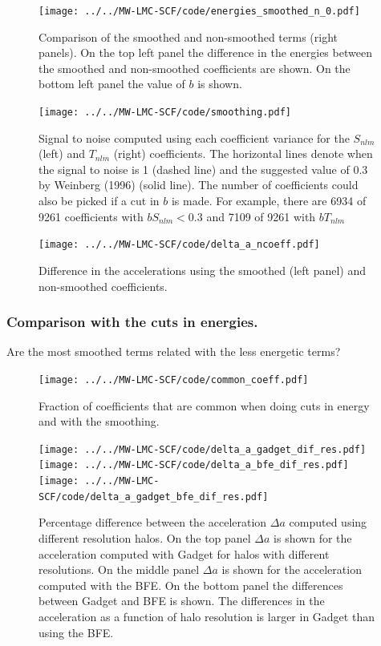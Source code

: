 \documentclass[14pt]{article}
\begin{document}
\begin{figure}[H]
  \centering
  \texttt{[image: ../../MW-LMC-SCF/code/energies\_smoothed\_n\_0.pdf]}
  \caption{Comparison of the smoothed and non-smoothed terms (right panels). On the top left
  panel the difference in the energies between the smoothed and non-smoothed
  coefficients are shown. On the bottom left panel the value of $b$ is shown.}
\end{figure}


\begin{figure}[H]
  \centering
  \texttt{[image: ../../MW-LMC-SCF/code/smoothing.pdf]}
  \caption{Signal to noise computed using each coefficient variance for the
  $S_{nlm}$ (left) and $T_{nlm}$ (right) coefficients. The horizontal lines
  denote when the signal to noise is 1 (dashed line) and the suggested value of
  0.3 by Weinberg (1996) (solid line). The number of coefficients could also be
  picked if a cut in $b$ is made. For example, there are 6934 of 9261 coefficients with
  $bS_{nlm}<0.3$ and 7109 of 9261 with $bT_{nlm}$}
\end{figure}



\begin{figure}[H]
  \centering
  \texttt{[image: ../../MW-LMC-SCF/code/delta\_a\_ncoeff.pdf]}
  \caption{Difference in the accelerations using the smoothed (left panel) and
  non-smoothed coefficients. }
\end{figure}



\subsubsection{Comparison with the cuts in energies.}

Are the most smoothed terms related with the less energetic terms? 


\begin{figure}[H]
  \centering
  \texttt{[image: ../../MW-LMC-SCF/code/common\_coeff.pdf]}
  \caption{Fraction of coefficients that are common when doing cuts in energy
  and with the smoothing.}
\end{figure}



\begin{figure}[H]
  \centering
  \texttt{[image: ../../MW-LMC-SCF/code/delta\_a\_gadget\_dif\_res.pdf]}
  \texttt{[image: ../../MW-LMC-SCF/code/delta\_a\_bfe\_dif\_res.pdf]}
  \texttt{[image: ../../MW-LMC-SCF/code/delta\_a\_gadget\_bfe\_dif\_res.pdf]}
  \caption{Percentage difference between the acceleration $\Delta a$ computed using
  different resolution halos. On the top panel $\Delta a$ is shown for the
  acceleration computed with Gadget for halos with different resolutions. On the
  middle panel $\Delta a$ is shown for the acceleration computed with the BFE.
  On the bottom panel the differences between Gadget and BFE is shown. The
  differences in the acceleration as a function of halo resolution is larger
  in Gadget than using the BFE.}
\end{figure}
\end{document}
